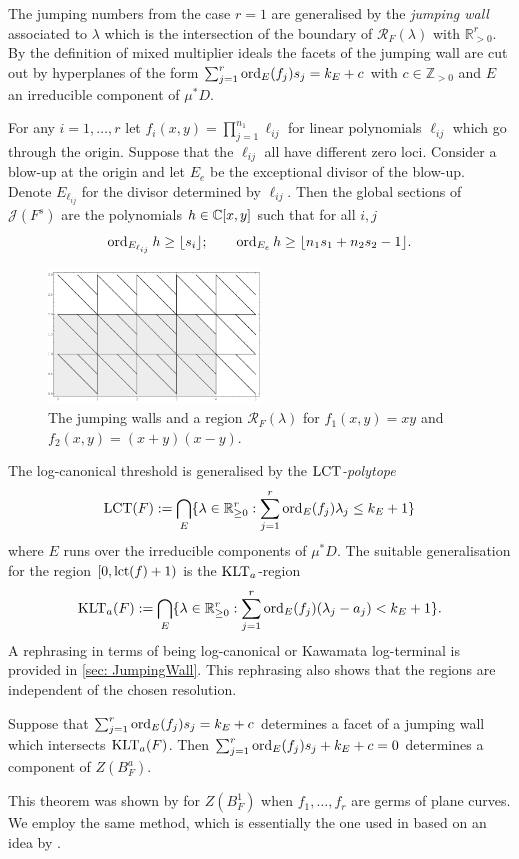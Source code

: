 The jumping numbers from the case $r=1$ are generalised by the {\it jumping wall} associated to $\lambda$ which is the intersection of the boundary of $\mathcal{R}_F(\lambda)$ with $\mathbb{R}_{>0}^r$.
By the definition of mixed multiplier ideals the facets of the jumping wall are cut out by hyperplanes of the form
$\sum_{j=1}^r\operatorname{ord}_E(f_j)s_j = k_E + c$
with $c\in \mathbb{Z}_{>0}$ and $E$ an irreducible component of $\mu^*D$.
\begin{example}
  For any $i=1,\ldots,r$ let $f_i(x,y) = \prod_{j=1}^{n_1} \ell_{ij}$ for linear polynomials $\ell_{ij}$ which go through the origin.
  Suppose that the $\ell_{ij}$ all have different zero loci.
  Consider a blow-up at the origin and let $E_{e}$ be the exceptional divisor of the blow-up.
  Denote $E_{\ell_{ij}}$ for the divisor determined by $\ell_{ij}$.
  Then the global sections of $\mathcal{J}(F^s)$ are the polynomials $h\in \mathbb{C}[x,y]$ such that for all $i,j$
  $$\operatorname{ord}_{E_{\ell_{ij}}} h\geq \lfloor s_i \rfloor;\qquad \operatorname{ord}_{E_{e}} h \geq \lfloor n_1s_1 + n_2s_2 - 1 \rfloor. $$
  \begin{figure}[h!]
    \centering
    \includegraphics[width = 0.5\textwidth]{Figures/LargeJumps}
    \caption{The jumping walls and a region $\mathcal{R}_F(\lambda)$ for $f_1(x,y) =xy$ and $f_2(x,y)=(x+y)(x-y)$.}
  \end{figure}
\end{example}
The log-canonical threshold is generalised by the {\it $\operatorname{LCT}$-polytope}
$$ \operatorname{LCT}(F) :=  \bigcap_{E}\{\lambda\in \mathbb{R}_{\geq 0}^r : \sum_{j=1}^r \operatorname{ord}_E(f_j)\lambda_j \leq k_E + 1\}$$
where $E$ runs over the irreducible components of $\mu^*D$.
The suitable generalisation for the region $[0,\operatorname{lct}(f) + 1)$ is the $\operatorname{KLT}_{a}$-region
$$\operatorname{KLT}_{a}(F):= \bigcap_{E}\{\lambda\in \mathbb{R}_{\geq 0}^r: \sum_{j=1}^r \operatorname{ord}_E(f_j)(\lambda_j - a_j) < k_E + 1\}.$$
A rephrasing in terms of being log-canonical or Kawamata log-terminal is provided in \cref{sec: JumpingWall}.
This rephrasing also shows that the regions are independent of the chosen resolution.
\begin{theorem}\label{thm: JumpingWall}
  Suppose that $\sum_{j=1}^r \operatorname{ord}_E(f_j)s_j = k_E + c$ determines a facet of a jumping wall which intersects $\operatorname{KLT}_{a}(F)$.
  Then $\sum_{j=1}^r \operatorname{ord}_E(f_j)s_j + k_E + c = 0$ determines a component of $Z(B_F^a)$.
\end{theorem}
This theorem was shown by \cite{cassou2011multivariable} for $Z(B_F^{1})$ when $f_1,\ldots, f_r$ are germs of plane curves.
We employ the same method, which is essentially the one used in \cite[Theorem B]{ClassicalJump} based on an idea by \cite{kollar1997singularities}.

